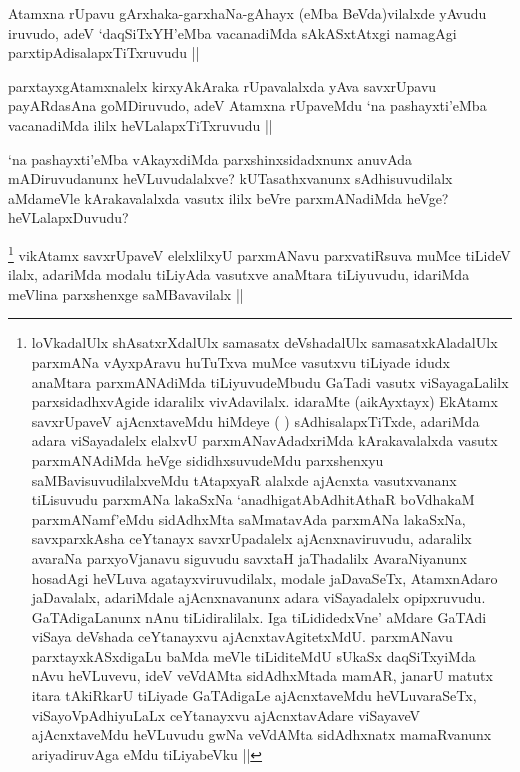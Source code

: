 
\begin{artha}
Atamxna rUpavu gArxhaka-garxhaNa-gAhayx (eMba BeVda)vilalxde yAvudu iruvudo, adeV `daqSiTxYH'eMba vacanadiMda sAkASxtAtxgi namagAgi parxtipAdisalapxTiTxruvudu ||
\end{artha}


\begin{artha}
parxtayxgAtamxnalelx kirxyAkAraka rUpavalalxda yAva savxrUpavu payARdasAna goMDiruvudo, adeV Atamxna rUpaveMdu `na pashayxti'eMba vacanadiMda ililx heVLalapxTiTxruvudu ||
\end{artha}


\begin{artha}
`na pashayxti'eMba vAkayxdiMda parxshinxsidadxnunx anuvAda mADiruvudanunx heVLuvudalalxve? kUTasathxvanunx sAdhisuvudilalx aMdameVle kArakavalalxda vasutx ililx beVre parxmANadiMda heVge? heVLalapxDuvudu?
\end{artha}


\begin{artha}
\footnote{loVkadalUlx shAsatxrXdalUlx samasatx deVshadalUlx samasatxkAladalUlx parxmANa vAyxpAravu huTuTxva muMce vasutxvu tiLiyade idudx anaMtara parxmANAdiMda tiLiyuvudeMbudu GaTadi vasutx viSayagaLalilx parxsidadhxvAgide idaralilx vivAdavilalx. idaraMte (aikAyxtayx) EkAtamx savxrUpaveV ajAcnxtaveMdu hiMdeye ( ) sAdhisalapxTiTxde, adariMda adara viSayadalelx elalxvU parxmANavAdadxriMda kArakavalalxda vasutx parxmANAdiMda heVge sididhxsuvudeMdu parxshenxyu saMBavisuvudilalxveMdu tAtapxyaR alalxde ajAcnxta vasutxvananx tiLisuvudu parxmANa lakaSxNa `anadhigatAbAdhitAthaR boVdhakaM parxmANamf'eMdu sidAdhxMta saMmatavAda parxmANa lakaSxNa, savxparxkAsha ceYtanayx savxrUpadalelx ajAcnxnaviruvudu, adaralilx avaraNa parxyoVjanavu siguvudu savxtaH jaThadalilx AvaraNiyanunx hosadAgi heVLuva agatayxviruvudilalx, modale jaDavaSeTx, AtamxnAdaro jaDavalalx, adariMdale ajAcnxnavanunx adara viSayadalelx opipxruvudu. GaTAdigaLanunx nAnu tiLidiralilalx. Iga tiLididedxVne' aMdare GaTAdi viSaya deVshada ceYtanayxvu ajAcnxtavAgitetxMdU. parxmANavu parxtayxkASxdigaLu baMda meVle tiLiditeMdU sUkaSx daqSiTxyiMda nAvu heVLuvevu, ideV veVdAMta sidAdhxMtada mamAR, janarU matutx itara tAkiRkarU tiLiyade GaTAdigaLe ajAcnxtaveMdu heVLuvaraSeTx, viSayoVpAdhiyuLaLx ceYtanayxvu ajAcnxtavAdare viSayaveV ajAcnxtaveMdu heVLuvudu gwNa veVdAMta sidAdhxnatx mamaRvanunx ariyadiruvAga eMdu tiLiyabeVku ||}
vikAtamx savxrUpaveV elelxlilxyU parxmANavu parxvatiRsuva muMce tiLideV ilalx, adariMda modalu tiLiyAda vasutxve anaMtara tiLiyuvudu, idariMda meVlina parxshenxge saMBavavilalx ||
\end{artha}

